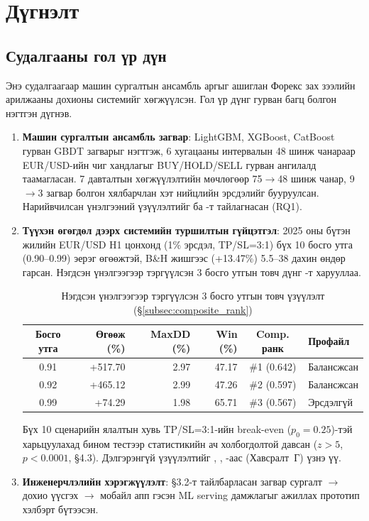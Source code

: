 \section{Дүгнэлт}
\label{sec:conclusion}

\subsection{Судалгааны гол үр дүн}

Энэ судалгаагаар машин сургалтын ансамбль аргыг ашиглан Форекс зах зээлийн арилжааны дохионы системийг хөгжүүлсэн. Гол үр дүнг гурван багц болгон нэгтгэн дүгнэв.

\begin{enumerate}
    \item \textbf{Машин сургалтын ансамбль загвар}: LightGBM, XGBoost, CatBoost гурван GBDT загварыг нэгтгэж, 6 хугацааны интервалын 48 шинж чанараар EUR/USD-ийн чиг хандлагыг BUY/HOLD/SELL гурван ангилалд таамагласан. 7 давталтын хөгжүүлэлтийн мөчлөгөөр 75$\to$48 шинж чанар, 9$\to$3 загвар болгон хялбарчлан хэт нийцлийн эрсдэлийг бууруулсан. Нарийвчилсан үнэлгээний үзүүлэлтийг  ба -т тайлагнасан (RQ1).

    \item \textbf{Түүхэн өгөгдөл дээрх системийн туршилтын гүйцэтгэл}: 2025 оны бүтэн жилийн EUR/USD H1 цонхонд (1\% эрсдэл, TP/SL=3:1) бүх 10 босго утга (0.90--0.99) эерэг өгөөжтэй, B\&H жишгээс (+13.47\%) 5.5--38 дахин өндөр гарсан. Нэгдсэн үнэлгээгээр тэргүүлсэн 3 босго утгын товч дүнг -т харууллаа.

\begin{table}[H]
\centering
\caption{Нэгдсэн үнэлгээгээр тэргүүлсэн 3 босго утгын товч үзүүлэлт (§\ref{subsec:composite_rank})}
\label{tab:rq3_summary}
\renewcommand{\arraystretch}{1.18}
\setlength{\tabcolsep}{4pt}
\begin{tabular}{|c|r|r|r|c|l|}
\hline
\textbf{Босго утга} & \textbf{Өгөөж (\%)} & \textbf{MaxDD (\%)} & \textbf{Win (\%)} & \textbf{Comp. ранк} & \textbf{Профайл} \\ \hline
0.91 & +517.70 & 2.97 & 47.17 & \#1 (0.642) & Балансжсан \\ \hline
0.92 & +465.12 & 2.99 & 47.26 & \#2 (0.597) & Балансжсан \\ \hline
0.99 & +74.29  & 1.98 & 65.71 & \#3 (0.567) & Эрсдэлгүй \\ \hline
\end{tabular}
\end{table}

Бүх 10 сценарийн ялалтын хувь TP/SL=3:1-ийн break-even ($p_0=0.25$)-тэй харьцуулахад бином тестээр статистикийн ач холбогдолтой давсан ($z>5$, $p<0.0001$, §4.3). Дэлгэрэнгүй үзүүлэлтийг , , -аас (Хавсралт~Г) үзнэ үү.

    \item \textbf{Инженерчлэлийн хэрэгжүүлэлт}: §3.2-т тайлбарласан загвар сургалт $\to$ дохио үүсгэх $\to$ мобайл апп гэсэн ML serving дамжлагыг ажиллах прототип хэлбэрт бүтээсэн.
\end{enumerate}

